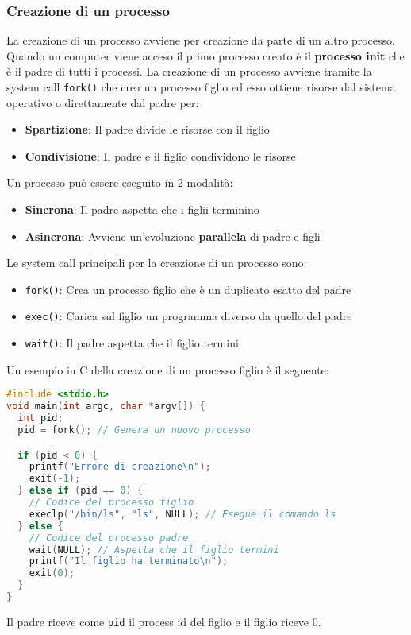\documentclass[a4paper]{article}
\begin{document}
\subsubsection{Creazione di un processo}
La creazione di un processo avviene per creazione da parte di un altro processo. Quando
un computer viene acceso il primo processo creato è il \textbf{processo init} che è il
padre di tutti i processi. La creazione di un processo avviene tramite la system call
\texttt{fork()} che crea un processo figlio ed esso ottiene
risorse dal sistema operativo o direttamente dal padre per:
\begin{itemize}
  \item \textbf{Spartizione}: Il padre divide le risorse con il figlio
  \item \textbf{Condivisione}: Il padre e il figlio condividono le risorse
\end{itemize}
Un processo può essere eseguito in 2 modalità:
\begin{itemize}
  \item \textbf{Sincrona}: Il padre aspetta che i figlii terminino
  \item \textbf{Asincrona}: Avviene un'evoluzione \textbf{parallela} di padre e figli
\end{itemize}

\vspace{1em}
\noindent
Le system call principali per la creazione di un processo sono:
\begin{itemize}
  \item \texttt{fork()}: Crea un processo figlio che è un duplicato esatto del padre
  \item \texttt{exec()}: Carica sul figlio un programma diverso da quello del padre
  \item \texttt{wait()}: Il padre aspetta che il figlio termini
\end{itemize}

\begin{example}
  Un esempio in C della creazione di un processo figlio è il seguente:
  \begin{lstlisting}[language=C]
#include <stdio.h>
void main(int argc, char *argv[]) {
  int pid;
  pid = fork(); // Genera un nuovo processo

  if (pid < 0) {
    printf("Errore di creazione\n");
    exit(-1);
  } else if (pid == 0) {
    // Codice del processo figlio
    execlp("/bin/ls", "ls", NULL); // Esegue il comando ls
  } else {
    // Codice del processo padre
    wait(NULL); // Aspetta che il figlio termini
    printf("Il figlio ha terminato\n");
    exit(0);
  }
}
  \end{lstlisting}
  Il padre riceve come \texttt{pid} il process id del figlio e il figlio riceve 0.
\end{example}
\end{document}
